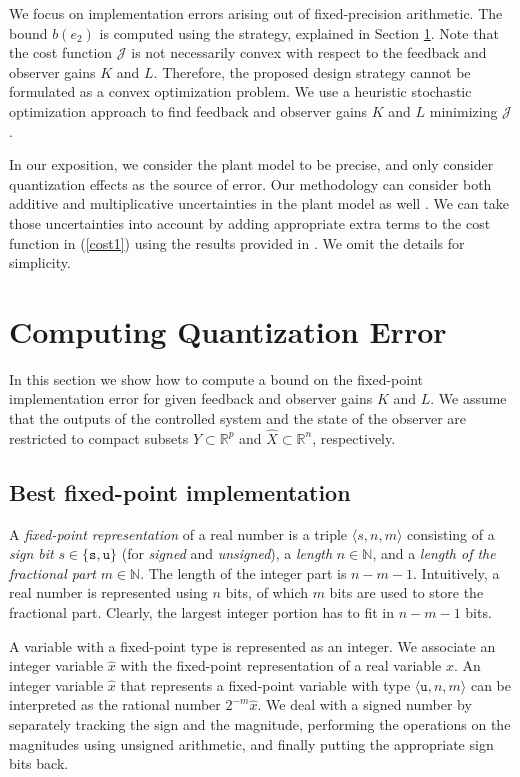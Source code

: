 \documentclass{amsart}
\numberwithin{equation}{section}
\newcommand{\R}{{\mathbb{R}}}
\def\set#1{{ \{ #1 \}}}
\def\tuple#1{{ \langle #1 \rangle}}
\def\nats{\mathbb{N}}
\begin{document}
We focus on implementation errors arising out of fixed-precision arithmetic. The bound $b(e_2)$ is computed using the strategy, explained in Section \ref{error_comp}. 
Note that the cost function $\mathcal{J}$ is not necessarily convex with respect to the feedback and observer gains $K$ and $L$. 
Therefore, the proposed design strategy cannot be formulated as a convex optimization problem. We use a heuristic stochastic optimization approach
to find feedback and observer gains $K$ and $L$ minimizing $\mathcal{J}$. 

In our exposition, we consider the plant model to be precise, and only consider quantization effects as the source of error.
Our methodology can consider both additive and multiplicative uncertainties in the plant model as well \cite{green}. 
We can take those uncertainties into account by adding appropriate extra terms to the cost function in (\ref{cost1}) 
using the results provided in \cite{majid1,majid2}. 
We omit the details for simplicity.

\section{Computing Quantization Error }\label{error_comp}

In this section we show how to compute a bound on the fixed-point implementation error for given feedback and observer gains $K$ and $L$. 
We assume that the outputs of the controlled system and the state of the observer are restricted to compact subsets $Y\subset\R^p$ and $\widehat{X}\subset\R^n$, respectively. 

\subsection{Best fixed-point implementation}
A {\em fixed-point representation} of a real number is a triple $\tuple{s,n,m}$ 
consisting of a {\em sign bit} $s\in\set{\mathtt{s},\mathtt{u}}$ (for {\em signed} and {\em unsigned}),
a {\em length} $n\in\nats$, and a {\em length of the fractional part} $m\in\nats$.
The length of the integer part is $n - m -1$. 
Intuitively, a real number is represented using $n$ bits, of which $m$ bits are used to store
the fractional part.
Clearly, the largest integer portion has to fit in $n-m-1$ bits.

A variable with a fixed-point type is represented as an integer. 
We associate an integer variable $\hat{x}$ with the fixed-point representation of a real variable $x$.
An integer variable $\hat{x}$ that represents a fixed-point variable with type  $\tuple{\mathtt{u},n,m}$
can be interpreted as the rational number $2^{-m} \hat{x}$.
We deal with a signed number by separately tracking the sign and the magnitude,
performing the operations on the magnitudes using unsigned arithmetic, and
finally putting the appropriate sign bits back.
\end{document}
